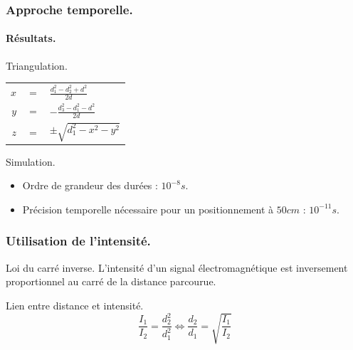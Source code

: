 \begin{frame}
    \frametitle{Approche temporelle.}
    \framesubtitle{Résultats.}
    \begin{block}{Triangulation.}
        \begin{center}
            \begin{tabular}{rcl}
                $x$ & $=$ & $\frac{d_1^2-d_2^2+d^2}{2d}$ \\
                $y$ & $=$ & $-\frac{d_3^2-d_1^2-d^2}{2d}$ \\
                $z$ & $=$ & $\pm\sqrt{d_1^2-x^2-y^2}$ \\
            \end{tabular}
        \end{center}
    \end{block}
     {
        \begin{exampleblock}{Simulation.}
            \begin{itemize}
                \pause \item Ordre de grandeur des durées : $10^{-8}s$.
                \pause \item Précision temporelle nécessaire pour un positionnement à $50cm$ : $10^{-11}s$.
            \end{itemize}
        \end{exampleblock}
    }
\end{frame}

\begin{frame}
    \frametitle{Utilisation de l'intensité.}
    \begin{exampleblock}{Loi du carré inverse.}
        L'intensité d'un signal électromagnétique est inversement proportionnel au carré de la distance parcourue.
    \end{exampleblock}
     { \begin{block}{Lien entre distance et intensité.}
            \[ \frac{I_1}{I_2} = \frac{d_2^2}{d_1^2} \Leftrightarrow \frac{d_2}{d_1} = \sqrt{\frac{I_1}{I_2}} \]
    \end{block} }
\end{frame}

